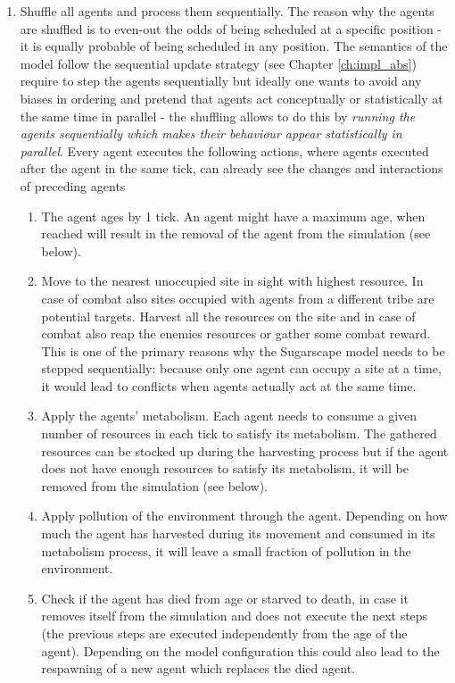 \begin{enumerate}
	\item Shuffle all agents and process them sequentially. The reason why the agents are shuffled is to even-out the odds of being scheduled at a specific position - it is equally probable of being scheduled in any position. The semantics of the model follow the sequential update strategy (see Chapter \ref{ch:impl_abs}) require to step the agents sequentially but ideally one wants to avoid any biases in ordering and pretend that agents act conceptually or statistically at the same time in parallel - the shuffling allows to do this by \textit{running the agents sequentially which makes their behaviour appear statistically in parallel}. Every agent executes the following actions, where agents executed after the agent in the same tick, can already see the changes and interactions of preceding agents
	
	\begin{enumerate}
		\item The agent ages by 1 tick. An agent might have a maximum age, when reached will result in the removal of the agent from the simulation (see below).
	
		\item Move to the nearest unoccupied site in sight with highest resource. In case of combat also sites occupied with agents from a different tribe are potential targets. Harvest all the resources on the site and in case of combat also reap the enemies resources or gather some combat reward. This is one of the primary reasons why the Sugarscape model needs to be stepped sequentially: because only one agent can occupy a site at a time, it would lead to conflicts when agents actually act at the same time.

		\item Apply the agents' metabolism. Each agent needs to consume a given number of resources in each tick to satisfy its metabolism. The gathered resources can be stocked up during the harvesting process but if the agent does not have enough resources to satisfy its metabolism, it will be removed from the simulation (see below).
		
		\item Apply pollution of the environment through the agent. Depending on how much the agent has harvested during its movement and consumed in its metabolism process, it will leave a small fraction of pollution in the environment.
		
		\item Check if the agent has died from age or starved to death, in case it removes itself from the simulation and does not execute the next steps (the previous steps are executed independently from the age of the agent). Depending on the model configuration this could also lead to the respawning of a new agent which replaces the died agent.
		

\end{enumerate}
\end{enumerate}
